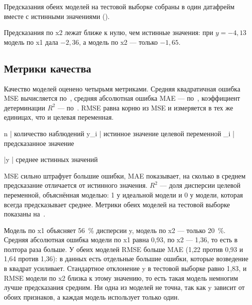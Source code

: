 \documentclass[a4paper,14pt]{extarticle}
\begin{document}

Предсказания обеих моделей на тестовой выборке собраны в один датафрейм вместе с истинными значениями ().


Предсказания по x2 лежат ближе к нулю, чем истинные значения: при $y = -4{,}13$ модель по x1 дала $-2{,}36$, а модель по x2 — только $-1{,}65$.

\subsection{Метрики качества}

Качество моделей оценено четырьмя метриками. Средняя квадратичная ошибка MSE вычисляется по~, средняя абсолютная ошибка MAE — по~, коэффициент детерминации $R^2$ — по~. RMSE равна корню из MSE и измеряется в тех же единицах, что и целевая переменная.

n | количество наблюдений
y_i | истинное значение целевой переменной
_i | предсказанное значение


\bar{y} | среднее истинных значений

MSE сильно штрафует большие ошибки, MAE показывает, на сколько в среднем предсказание отличается от истинного значения. $R^2$ — доля дисперсии целевой переменной, объяснённая моделью: 1 у идеальной модели и 0 у модели, которая всегда предсказывает среднее. Метрики обеих моделей на тестовой выборке показаны на~.


Модель по x1 объясняет 56~\% дисперсии y, модель по x2 — только 20~\%. Средняя абсолютная ошибка модели по x1 равна 0,93, по x2 — 1,36, то есть в полтора раза больше. У обеих моделей RMSE больше MAE (1,22 против 0,93 и 1,64 против 1,36): в данных есть отдельные большие ошибки, которые возведение в квадрат усиливает. Стандартное отклонение y в тестовой выборке равно 1,83, и RMSE модели по x2 близка к этому значению, то есть такая модель немногим лучше предсказания средним. Ни одна из моделей не точна, так как y зависит от обоих признаков, а каждая модель использует только один.
\end{document}

